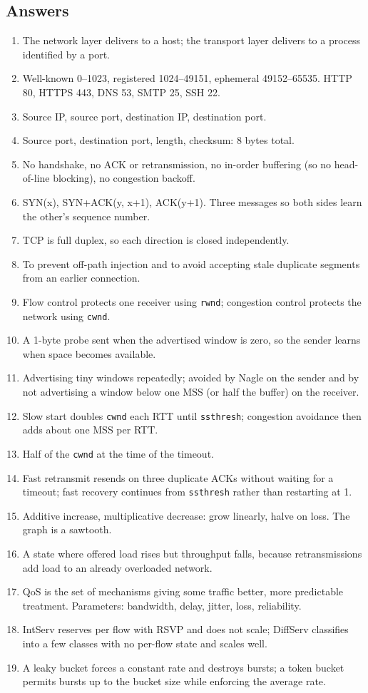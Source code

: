 \documentclass[11pt,a4paper]{article}
\begin{document}
\subsection*{Answers}
\begin{enumerate}
\item The network layer delivers to a host; the transport layer delivers to a process identified by a port.
\item Well-known 0--1023, registered 1024--49151, ephemeral 49152--65535. HTTP 80, HTTPS 443, DNS 53, SMTP 25, SSH 22.
\item Source IP, source port, destination IP, destination port.
\item Source port, destination port, length, checksum: 8 bytes total.
\item No handshake, no ACK or retransmission, no in-order buffering (so no head-of-line blocking), no congestion backoff.
\item SYN(x), SYN+ACK(y, x+1), ACK(y+1). Three messages so both sides learn the other's sequence number.
\item TCP is full duplex, so each direction is closed independently.
\item To prevent off-path injection and to avoid accepting stale duplicate segments from an earlier connection.
\item Flow control protects one receiver using \texttt{rwnd}; congestion control protects the network using \texttt{cwnd}.
\item A 1-byte probe sent when the advertised window is zero, so the sender learns when space becomes available.
\item Advertising tiny windows repeatedly; avoided by Nagle on the sender and by not advertising a window below one MSS (or half the buffer) on the receiver.
\item Slow start doubles \texttt{cwnd} each RTT until \texttt{ssthresh}; congestion avoidance then adds about one MSS per RTT.
\item Half of the \texttt{cwnd} at the time of the timeout.
\item Fast retransmit resends on three duplicate ACKs without waiting for a timeout; fast recovery continues from \texttt{ssthresh} rather than restarting at 1.
\item Additive increase, multiplicative decrease: grow linearly, halve on loss. The graph is a sawtooth.
\item A state where offered load rises but throughput falls, because retransmissions add load to an already overloaded network.
\item QoS is the set of mechanisms giving some traffic better, more predictable treatment. Parameters: bandwidth, delay, jitter, loss, reliability.
\item IntServ reserves per flow with RSVP and does not scale; DiffServ classifies into a few classes with no per-flow state and scales well.
\item A leaky bucket forces a constant rate and destroys bursts; a token bucket permits bursts up to the bucket size while enforcing the average rate.
\end{enumerate}
\end{document}
